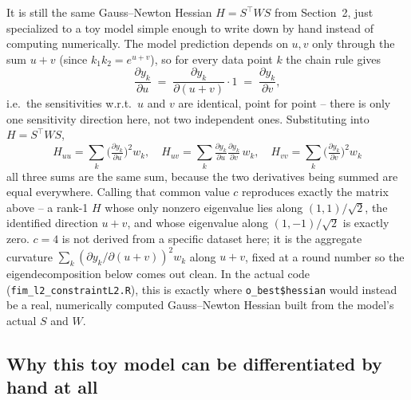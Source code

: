 \documentclass[11pt]{article}
\newcommand{\code}[1]{\texttt{#1}}
\newcommand{\file}[1]{\textcolor{black!60}{\texttt{#1}}}
\begin{document}
It is still the same Gauss--Newton Hessian $H=S^\top WS$ from Section~2, just
specialized to a toy model simple enough to write down by hand instead of
computing numerically. The model prediction depends on $u,v$ only through the
sum $u+v$ (since $k_1k_2=e^{u+v}$), so for every data point $k$ the chain rule
gives
\begin{equation}
  \frac{\partial y_k}{\partial u} \;=\; \frac{\partial y_k}{\partial(u+v)}\cdot 1
  \;=\; \frac{\partial y_k}{\partial v},
\end{equation}
i.e.\ the sensitivities w.r.t.\ $u$ and $v$ are identical, point for point --
there is only one sensitivity direction here, not two independent ones.
Substituting into $H=S^\top WS$,
\begin{equation}
  H_{uu} = \sum_k\Big(\tfrac{\partial y_k}{\partial u}\Big)^{\!2} w_k, \quad
  H_{uv} = \sum_k \tfrac{\partial y_k}{\partial u}\tfrac{\partial y_k}{\partial v}\,w_k, \quad
  H_{vv} = \sum_k\Big(\tfrac{\partial y_k}{\partial v}\Big)^{\!2} w_k
\end{equation}
all three sums are the same sum, because the two derivatives being summed are
equal everywhere. Calling that common value $c$ reproduces exactly the matrix
above -- a rank-1 $H$ whose only nonzero eigenvalue lies along $(1,1)/\sqrt2$,
the identified direction $u+v$, and whose eigenvalue along $(1,-1)/\sqrt2$ is
exactly zero. $c=4$ is not derived from a specific dataset here; it is the
aggregate curvature $\sum_k(\partial y_k/\partial(u+v))^2w_k$ along $u+v$,
fixed at a round number so the eigendecomposition below comes out clean. In
the actual code (\file{fim\_l2\_constraintL2.R}), this is exactly where
\code{o\_best\$hessian} would instead be a real, numerically computed
Gauss--Newton Hessian built from the model's actual $S$ and $W$.

\subsection*{Why this toy model can be differentiated by hand at all}
\end{document}
